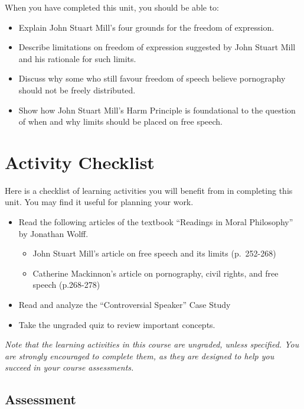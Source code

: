 \documentclass[
]{book}
\providecommand{\tightlist}{%
  \setlength{\itemsep}{0pt}\setlength{\parskip}{0pt}}
\begin{document}
When you have completed this unit, you should be able to:

\begin{itemize}
\tightlist
\item
  Explain John Stuart Mill's four grounds for the freedom of expression.
\item
  Describe limitations on freedom of expression suggested by John Stuart Mill and his rationale for such limits.
\item
  Discuss why some who still favour freedom of speech believe pornography should not be freely distributed.
\item
  Show how John Stuart Mill's Harm Principle is foundational to the question of when and why limits should be placed on free speech.
\end{itemize}

\hypertarget{activity-checklist-2}{%
\section*{Activity Checklist}\label{activity-checklist-2}}

Here is a checklist of learning activities you will benefit from in completing this unit. You may find it useful for planning your work.

\begin{itemize}
\tightlist
\item
  Read the following articles of the textbook ``Readings in Moral Philosophy'' by Jonathan Wolff.

  \begin{itemize}
  \tightlist
  \item
    John Stuart Mill's article on free speech and its limits (p.~252-268)
  \item
    Catherine Mackinnon's article on pornography, civil rights, and free speech (p.268-278)
  \end{itemize}
\item
  Read and analyze the ``Controversial Speaker'' Case Study
\item
  Take the ungraded quiz to review important concepts.
\end{itemize}

\emph{Note that the learning activities in this course are ungraded, unless specified. You are strongly encouraged to complete them, as they are designed to help you succeed in your course assessments.}

\hypertarget{assessment-4}{%
\subsection*{Assessment}\label{assessment-4}}
\end{document}
